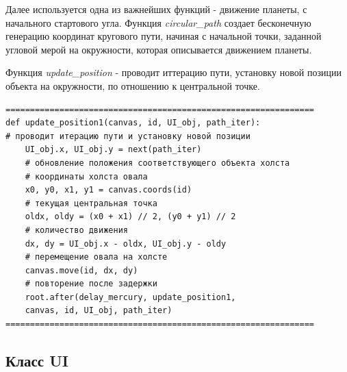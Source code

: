 \documentclass[11pt,a4paper]{report}
\begin{document}
Далее используется одна из важнейших функций - движение планеты, с начального стартового угла.
Функция \textit{circular\_path} создает бесконечную генерацию координат кругового пути, начиная с начальной точки, заданной угловой мерой на окружности, которая описывается движением планеты.

Функция \textit{update\_position}  - проводит иттерацию пути, установку новой позиции объекта на окружности, по отношению к центральной точке. 


\begin{verbatim}
===============================================================
def update_position1(canvas, id, UI_obj, path_iter):
# проводит итерацию пути и установку новой позиции
    UI_obj.x, UI_obj.y = next(path_iter)  
    # обновление положения соответствующего объекта холста
    # координаты холста овала
    x0, y0, x1, y1 = canvas.coords(id)  
    # текущая центральная точка
    oldx, oldy = (x0 + x1) // 2, (y0 + y1) // 2  
    # количество движения
    dx, dy = UI_obj.x - oldx, UI_obj.y - oldy  
    # перемещение овала на холсте
    canvas.move(id, dx, dy)  
    # повторение после задержки
    root.after(delay_mercury, update_position1, 
    canvas, id, UI_obj, path_iter)
===============================================================
\end{verbatim}
\subsection{Класс UI}
\end{document}
